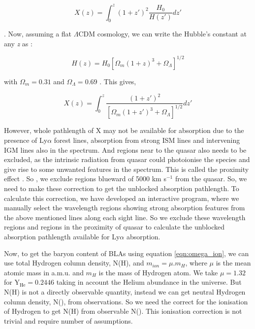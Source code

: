\begin{equation}
    X(z)=\int_0^z  (1+z')^2 \frac{H_0}{H(z')} dz'
\end{equation}

\citep{Bahcall-1969}. Now, assuming a flat $\Lambda \text{CDM}$ cosmology, we can write the Hubble's constant at any \emph{z} as :

\begin{equation}
    H(z) = H_0 \left[\Omega_m(1+z)^3+\Omega_\Lambda\right]^{1/2}
\end{equation}

with $\Omega_m=0.31$ and $\Omega_\Lambda=0.69$ \citep{planck_collaboration_planck_2020}. This gives,

\begin{equation}
    X(z)=\int_0^z  \frac{(1+z')^2}{\left[\Omega_m(1+z')^3+\Omega_\Lambda\right]^{1/2}} dz'
\end{equation}

However, whole pathlength of X may not be available for absorption due to the presence of Ly$\alpha$ forest lines, absorption from strong ISM lines and intervening IGM lines also in the spectrum. And regions near to the quasar also needs to be excluded, as the intrinsic radiation from quasar could photoionise the species and give rise to some unwanted features in the spectrum. This is called the proximity effect \citep{Tripp-2008}. So , we exclude regions blueward of 5000 km s$^{-1}$ from the quasar. So, we need to make these correction to get the unblocked absorption pathlength. To calculate this correction, we have developed an interactive program, where we manually select the wavelength regions showing strong absorption features from the above mentioned lines along each sight line. So we exclude these wavelength regions and regions in the proximity of quasar to calculate the unblocked absorption pathlength available for Ly$\alpha$ absorption.

Now, to get the baryon content of BLAs using equation \ref{eqn:omega_ion}, we can use total Hydrogen column density, N(H), and $m_{ion}=\mu . m_H$, where $\mu$ is the mean atomic mass in a.m.u. and $m_H$ is the mass of Hydrogen atom. We take $\mu=1.32$ for $\text{Y}_\text{He}=0.2446$ \citep{Peimbert-2016} taking in account the Helium abundance in the universe. But N(H) is not a directly observable quantity, instead we can get neutral Hydrogen column density, N(), from observations. So we need the correct for the ionisation of Hydrogen to get N(H) from observable N(). This ionisation correction is not trivial and require number of assumptions.

